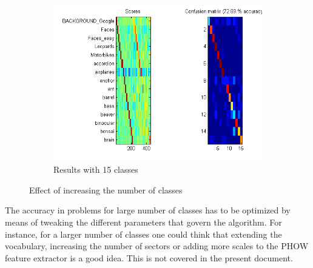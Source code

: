 \begin{figure}[htb]
	\begin{subfigure}[t]{0.4\textwidth}
		\includegraphics[width=\textwidth]{./img/ex1/eval-15-classes.png}
		\caption{Results with 15 classes}
	\end{subfigure}
\caption{Effect of increasing the number of classes}
\label{fig:effect-classes}
\end{figure}

The accuracy in problems for large number of classes has to be optimized by means of tweaking the different parameters that govern the algorithm. For instance, for a larger number of classes one could think that extending the vocabulary, increasing the number of sectors or adding more scales to the PHOW feature extractor is a good idea. This is not covered in the present document.